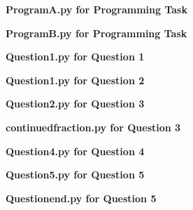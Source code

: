 \documentclass[12pt, a4paper]{article}
\begin{document}

\pagebreak
\textbf{Program\textunderscore A.py for Programming Task}\centering\label{Program_A}

\vspace{2cm}

\pagebreak
\textbf{Program\textunderscore B.py for Programming Task}\centering\label{Program_B}

\vspace{2cm}

\pagebreak
\textbf{Question\textunderscore 1.py for Question 1}\centering\label{Question_1}

\vspace{2cm}

\pagebreak
\textbf{Question\textunderscore 1.py for Question 2}\centering\label{Question_2}

\vspace{2cm}

\pagebreak
\textbf{Question\textunderscore 2.py for Question 3}\centering\label{Question_3}

\vspace{2cm}

\pagebreak
\textbf{continued\textunderscore fraction.py for Question 3}\centering\label{continued_fraction}

\vspace{2cm}

\pagebreak
\textbf{Question\textunderscore 4.py for Question 4}\centering\label{Question_4}

\vspace{2cm}

\pagebreak
\textbf{Question\textunderscore 5.py for Question 5}\centering\label{Question_5}

\vspace{2cm}

\pagebreak
\textbf{Question\textunderscore end.py for Question 5}\centering\label{Question_5_end}

\vspace{2cm}
\end{document}

